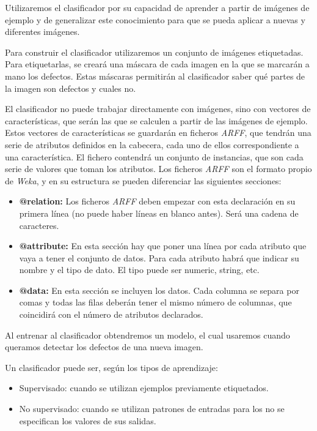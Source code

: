 Utilizaremos el clasificador por su capacidad de aprender a partir de imágenes de ejemplo y de generalizar este conocimiento para que se pueda aplicar a nuevas y diferentes imágenes.

Para construir el clasificador utilizaremos un conjunto de imágenes etiquetadas. Para etiquetarlas, se creará una máscara de cada imagen en la que se marcarán a mano los defectos. Estas máscaras permitirán al clasificador saber qué partes de la imagen son defectos y cuales no.

El clasificador no puede trabajar directamente con imágenes, sino con vectores de características, que serán las que se calculen a partir de las imágenes de ejemplo. Estos vectores de características se guardarán en ficheros \textit{ARFF}, que tendrán una serie de atributos definidos en la cabecera, cada uno de ellos correspondiente a una característica. El fichero contendrá un conjunto de instancias, que son cada serie de valores que toman los atributos. Los ficheros \textit{ARFF} son el formato propio de \textit{Weka}, y en su estructura se pueden diferenciar las siguientes secciones:

\begin{itemize}
\item \textbf{@relation:} Los ficheros \textit{ARFF} deben empezar con esta declaración en su primera línea (no puede haber líneas en blanco antes). Será una cadena de caracteres.

\item \textbf{@attribute:} En esta sección hay que poner una línea por cada atributo que vaya a tener el conjunto de datos. Para cada atributo habrá que indicar su nombre y el tipo de dato. El tipo puede ser numeric, string, etc.

\item \textbf{@data:} En esta sección se incluyen los datos. Cada columna se separa por comas y todas las
filas deberán tener el mismo número de columnas, que coincidirá con el número de atributos declarados.
\end{itemize}

Al entrenar al clasificador obtendremos un modelo, el cual usaremos cuando queramos detectar los defectos de una nueva imagen.

Un clasificador puede ser, según los tipos de aprendizaje:

\begin{itemize}
\item Supervisado: cuando se utilizan ejemplos previamente etiquetados.
\item No supervisado: cuando se utilizan patrones de entradas para los no se especifican los valores
de sus salidas.
\end{itemize}

